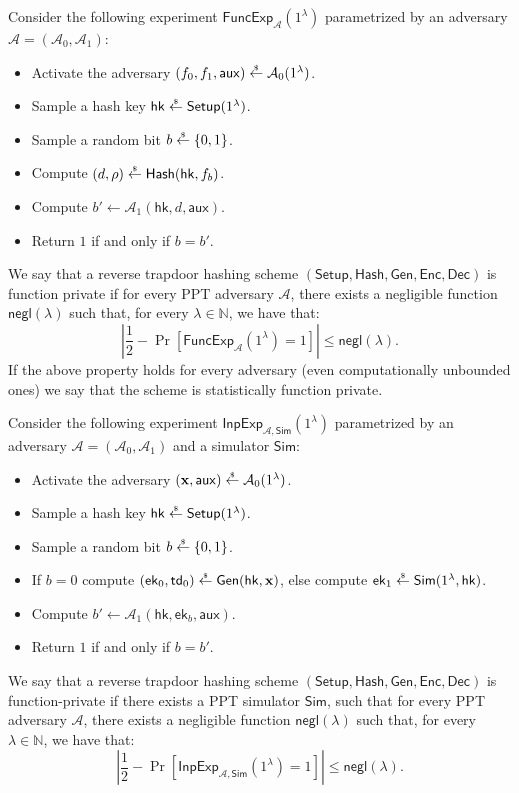 \documentclass{article}
\newcommand{\ek}{\mathsf{ek}}
\newcommand{\td}{\mathsf{td}}
\newcommand{\getsr}{\overset{\raisebox{-1pt}{$\scriptscriptstyle \$$}}{\gets}}
\newcommand{\sample}{\getsr}
\newcommand{\N}{\mathbb{N}}
\newcommand{\negl}{\mathsf{negl}}
\renewcommand{\sec}{\ensuremath{\lambda}}
\newcommand{\aux}{\mathsf{aux}}
\newcommand{\Sim}{\mathsf{Sim}}
\newcommand{\Adv}{\mathcal{A}}
\newcommand{\algofont}[1]{\ensuremath{\mathsf{#1}}}
\newcommand{\Enc}{{\algofont{Enc}}}
\newcommand{\Dec}{{\algofont{Dec}}}
\newcommand{\Setup}{{\algofont{Setup}}}
\newcommand{\Gen}{{\algofont{Gen}}}
\newcommand{\Hash}{{\algofont{Hash}}}
\newcommand{\hk}{\ensuremath{\mathsf{hk}}}
\newcommand\bbbone{1}
\begin{document}
\begin{definition}\leavevmode\par
Consider the following experiment $\mathsf{FuncExp}_{\mathcal{A}}(\bbbone^\sec)$ parametrized by an adversary $\mathcal{A} = (\mathcal{A}_0, \mathcal{A}_1)$:
\begin{itemize}
    \item Activate the adversary $(f_0, f_1, \aux)\sample\Adv_0(\bbbone^\sec)$.
    \item Sample a hash key $\hk\sample\Setup(\bbbone^\sec)$.
    \item Sample a random bit $b\sample\{0, 1\}$. 
    \item Compute $(d, \rho)\sample\Hash(\hk, f_b)$.
    \item Compute $b' \gets \Adv_1(\hk, d, \aux)$.
    \item Return $1$ if and only if $b =b'$.
\end{itemize}
We say that a reverse trapdoor hashing scheme $(\Setup, \Hash, \Gen, \Enc, \Dec)$ is function private if for every PPT adversary $\mathcal{A}$, there exists a negligible function $\negl(\sec)$ such that, for every $\sec\in\N$, we have that:
\[
\left|\frac{1}{2} - \Pr\left[\mathsf{FuncExp}_{\mathcal{A}}(\bbbone^\sec) = 1\right] \right|\le\negl(\sec).
\]
If the above property holds for every adversary (even computationally unbounded ones) we say that the scheme is statistically function private.
\end{definition}

\begin{definition}
Consider the following experiment $\mathsf{InpExp}_{\mathcal{A}, \Sim}(\bbbone^\sec)$ parametrized by an adversary $\mathcal{A} = (\mathcal{A}_0, \mathcal{A}_1)$ and a simulator $\Sim$:
\begin{itemize}
    \item Activate the adversary $(\mathbf{x}, \aux)\sample\Adv_0(\bbbone^\sec)$.
    \item Sample a hash key $\hk\sample\Setup(\bbbone^\sec)$.
    \item Sample a random bit $b\sample\{0, 1\}$. 
    \item If $b = 0$ compute $(\ek_0, \td_0)\sample\Gen(\hk, \mathbf{x})$, else compute 
    $\ek_1\sample\Sim(\bbbone^\sec, \hk)$.
    \item Compute $b' \gets \Adv_1(\hk, \ek_b, \aux)$.
    \item Return $1$ if and only if $b =b'$.
\end{itemize}
We say that a reverse trapdoor hashing scheme $(\Setup, \Hash, \Gen, \Enc, \Dec)$ is function-private if there exists a PPT simulator $\Sim$, such that for every PPT adversary $\mathcal{A}$, there exists a negligible function $\negl(\sec)$ such that, for every $\sec\in\N$, we have that:
\[
\left|\frac{1}{2} - \Pr\left[\mathsf{InpExp}_{\mathcal{A}, \Sim}(\bbbone^\sec) = 1\right] \right|\le\negl(\sec).
\]
\end{definition}
\end{document}
